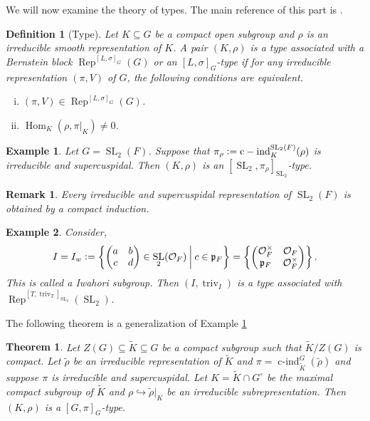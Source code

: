 \documentclass[8pt]{article}
\newtheorem{theorem}{Theorem} [section]
\newtheorem{definition}{Definition}[section]
\newtheorem{remark}{Remark}[section]
\newtheorem{example}{Example}[section]
\DeclareMathOperator{\triv}{triv}
\DeclareMathOperator{\cind}{c-ind}
\DeclareMathOperator{\SL}{SL}
\DeclareMathOperator{\Rep}{Rep}
\DeclareMathOperator{\Hom}{Hom}
\newcommand{\defeq}{\vcentcolon=}
\newcommand{\Ouv}{\mathcal{O}}
\begin{document}
We will now examine the theory of types. The main reference of this part is \cite{Buschnell}.

\begin{definition}[Type]
  Let $K\subseteq G$ be a compact open subgroup and $\rho$ is an irreducible smooth representation of $K$. A pair $(K,\rho)$ is a type associated with a Bernstein block $\Rep^{[L,\sigma]_G}(G)$ or an $[L,\sigma]_G$-type if for any irreducible representation $(\pi,V)$ of $G$, the following conditions are equivalent.
  \begin{enumerate}[i).]
    \item $(\pi,V)\in\Rep^{[L,\sigma]_G}(G)$.
    \item $\Hom_K(\rho,\pi|_K)\not=0$.
  \end{enumerate}
\end{definition}

\begin{example}
  \label{example_first_example_type}
  Let $G=\SL_2(F)$. Suppose that $\pi_\rho\defeq\cind_K^{\SL_2(F)}(\rho)$ is irreducible and supercuspidal. Then $(K,\rho)$ is an $[\SL_2,\pi_\rho]_{\SL_2}$-type. 
\end{example}

\begin{remark}
  Every irreducible and supercuspidal representation of $\SL_2(F)$ is obtained by a compact induction.
\end{remark}

\begin{example}
  Consider,
  \begin{equation*}
    I=I_w\defeq\left\{\begin{pmatrix}
      a & b\\
      c & d 
    \end{pmatrix}
    \in\SL_2(\Ouv_F)\:\bigg{|}\:c\in\mathfrak{p}_F\right\}=\left\{\begin{pmatrix}
      \Ouv_F^\times & \Ouv_F\\
      \mathfrak{p}_F & \Ouv_F^\times
    \end{pmatrix}
    \right\}.
  \end{equation*}
  This is called a Iwahori subgroup. Then $(I,\triv_I)$ is a type associated with $\Rep^{[T,\triv_T]_{\SL_2}}(\SL_2)$.
\end{example}
The following theorem is a generalization of Example \ref{example_first_example_type}
\begin{theorem}
  \label{theorem_116}
  Let $Z(G)\subseteq\widetilde{K}\subseteq G$ be a compact subgroup such that $\widetilde{K}/Z(G)$ is compact. Let $\widetilde{\rho}$ be an irreducible representation of $\widetilde{K}$ and $\pi = \cind_{\widetilde{K}}^G(\widetilde{\rho})$ and suppose $\pi$ is irreducible and supercuspidal.
  Let $K=\widetilde{K}\cap G^\circ$ be the maximal compact subgroup of $\widetilde{K}$ and $\rho\hookrightarrow\widetilde{\rho}|_K$ be an irreducible subrepresentation. Then $(K,\rho)$ is a $[G,\pi]_G$-type.
\end{theorem}
\end{document}
